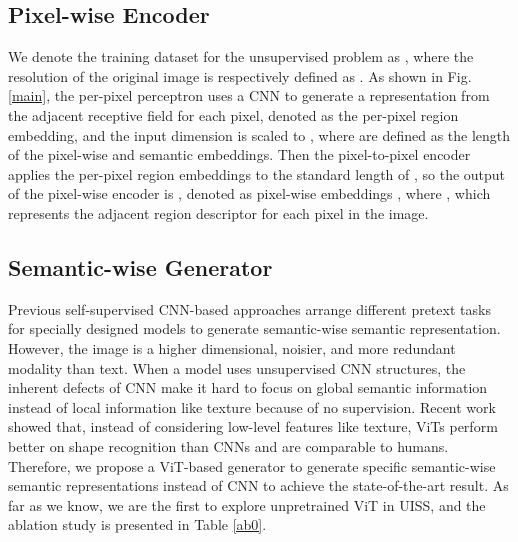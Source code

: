 \documentclass[letterpaper]{article} \usepackage{aaai23}  \usepackage{times}  \usepackage{helvet}  \usepackage{courier}  \usepackage[hyphens]{url}  \usepackage{graphicx} \urlstyle{rm} \def\UrlFont{\rm}  \usepackage{natbib}  \usepackage{caption} \frenchspacing  \setlength{\pdfpagewidth}{8.5in}  \setlength{\pdfpageheight}{11in}  \usepackage{algorithm}
\begin{document}
\subsection{Pixel-wise Encoder}
We denote the training dataset for the unsupervised problem as , where the resolution of the original image is respectively defined as . As shown in Fig.\ref{main}, the per-pixel perceptron uses a CNN to generate a representation from the adjacent receptive field for each pixel, denoted as the per-pixel region embedding, and the input dimension is scaled to , where  are defined as the length of the pixel-wise and semantic embeddings. Then the pixel-to-pixel encoder applies the per-pixel region embeddings to the standard length of , so the output of the pixel-wise encoder is , denoted as pixel-wise embeddings , where , which represents the adjacent region descriptor for each pixel in the image.

\subsection{Semantic-wise Generator}
Previous self-supervised CNN-based approaches\cite{zhang2016colorful}\cite{pathak2016context}\cite{chen2020generative} arrange different pretext tasks for specially designed models to generate semantic-wise semantic representation.
However, the image is a higher dimensional, noisier, and more redundant modality than text\cite{he2022masked}. When a model uses unsupervised CNN structures, the inherent defects of CNN make it hard to focus on global semantic information instead of local information like texture because of no supervision. Recent work\cite{naseer2021intriguing} showed that, instead of considering low-level features like texture, ViTs perform better on shape recognition than CNNs and are comparable to humans. Therefore, we propose a ViT-based generator to generate specific semantic-wise semantic representations instead of CNN to achieve the state-of-the-art result. As far as we know, we are the first to explore unpretrained ViT in UISS, and the ablation study is presented in Table \ref{ab0}. 
\end{document}
